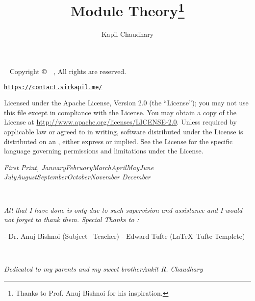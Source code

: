 \documentclass{tufte-book}
\title{Module Theory\thanks{Thanks to Prof. Anuj Bishnoi  for his inspiration.}}
\author[Kapil Chaudhary]{Kapil Chaudhary}
\theoremstyle{theorem}
\numberwithin{equation}{chapter}
\newcommand{\monthyear}{%
	\ifcase\month\or January\or February\or March\or April\or May\or June\or
	July\or August\or September\or October\or November\or
	December\fi\space\number\year
}
\begin{document}
\pagecolor{white!40!yellow}
\frontmatter

\maketitle
\newpage
\begin{fullwidth}
	~\vfill
	\thispagestyle{empty}
	\setlength{\parindent}{0pt}
	\setlength{\parskip}{\baselineskip}
	Copyright \copyright\ \the\year\ , All rights are reserved. \newline \thanklessauthor
		
	\par\smallcaps{\thanklesspublisher}
	
	\par\texttt{\url{https://contact.sirkapil.me/}}
	\par Licensed under the Apache License, Version 2.0 (the ``License''); you may not
	use this file except in compliance with the License. You may obtain a copy
	of the License at \url{http://www.apache.org/licenses/LICENSE-2.0}. Unless
	required by applicable law or agreed to in writing, software distributed
	under the License is distributed on an , either express or implied. See the
	License for the specific language governing permissions and limitations
	under the License.
	\par\textit{First Print, \monthyear}
\end{fullwidth}

\tableofcontents
\cleardoublepage
\begin{fullwidth}
~\vfill
\begin{doublespace}
	\noindent\fontsize{18}{22}\selectfont\itshape
	\nohyphenation
   All that I have done is only due to such supervision and assistance and I would not forget to thank them.\newline
\vfill
	Special Thanks to :\newline
        \begin{center}
        -  Dr. Anuj Bishnoi (Subject \ Teacher)\newline
		-	Edward Tufte (\LaTeX \  Tufte  Templete)
		\end{center}
\end{doublespace}
\vfill
\vfill
\end{fullwidth}
\newpage
\begin{fullwidth}
~\vfill
\vfill
\begin{doublespace}
	\noindent\fontsize{18}{22}\selectfont\itshape
	\nohyphenation
	\centering
	Dedicated to my parents and my sweet brother\newline\textrm{\textit{Ankit R. Chaudhary}}
 \end{doublespace}
\vfill
\vfill
\end{fullwidth}
\newpage
\pagecolor{white!30!yellow}
\end{document}

